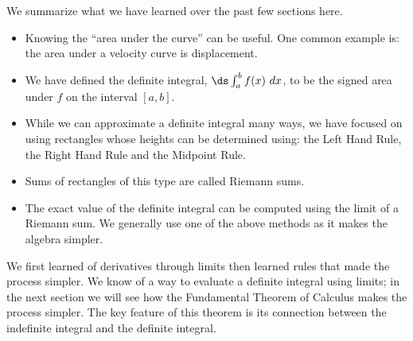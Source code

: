 We summarize what we have learned over the past few sections here.
\begin{itemize}
\item	Knowing the ``area under the curve'' can be useful. One common example is: the area under a velocity curve is displacement.
\item	We have defined the definite integral, $\ds\int_a^b f(x)\ dx$, to be the signed area under $f$ on the interval $[a,b]$. 
\item	While we can approximate a definite integral many ways, we have focused on using rectangles whose heights can be determined using: the Left Hand Rule, the Right Hand Rule and the Midpoint Rule. 
\item	Sums of rectangles of this type are called Riemann sums.
\item	The exact value of the definite integral can be computed using the limit of a Riemann sum. We generally use one of the above methods as it makes the algebra simpler.
\end{itemize}

We first learned of derivatives through limits then learned rules that made the process simpler. We know of a way to evaluate a definite integral using limits; in the next section we will see how the Fundamental Theorem of Calculus makes the process simpler. The key feature of this theorem is its connection between the indefinite integral and the definite integral.

